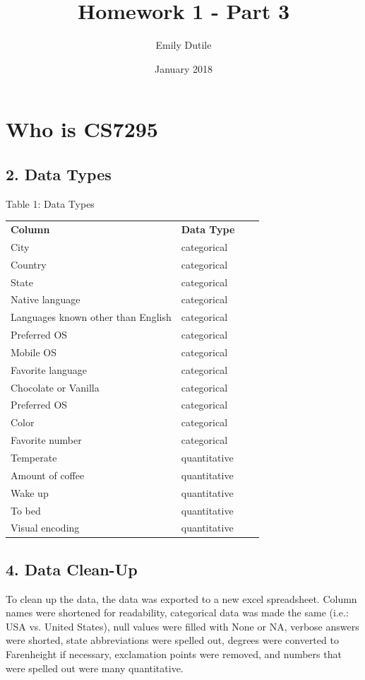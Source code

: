 \documentclass{neu_handout}
\title{Homework 1 - Part 3}
\author{Emily Dutile}
\date{January 2018}
\begin{document}
\section*{Who is CS7295}

\subsection*{2. Data Types}

\begin{center}
Table 1: Data Types
\end{center}
\begin{center} 
\begin{tabular}[h]{l l l l}
\textbf{Column} & \textbf{Data Type} \\
City & categorical \\
Country & categorical \\ 
State & categorical \\
Native language & categorical \\
Languages known other than English & categorical \\
Preferred OS & categorical \\
Mobile OS & categorical \\
Favorite language & categorical \\
Chocolate or Vanilla & categorical \\
Preferred OS & categorical \\
Color & categorical \\
Favorite number & categorical \\
Temperate & quantitative \\
Amount of coffee & quantitative \\
Wake up & quantitative \\
To bed & quantitative \\
Visual encoding & quantitative
\end{tabular}
\end{center}

\subsection*{4. Data Clean-Up}
To clean up the data, the data was exported to a new excel spreadsheet. Column names were shortened for readability, categorical data was made the same (i.e.: USA vs. United States), null values were filled with None or NA, verbose answers were shorted, state abbreviations were spelled out, degrees were converted to Farenheight if necessary, exclamation points were removed, and numbers that were spelled out were many quantitative.\\
\end{document}
